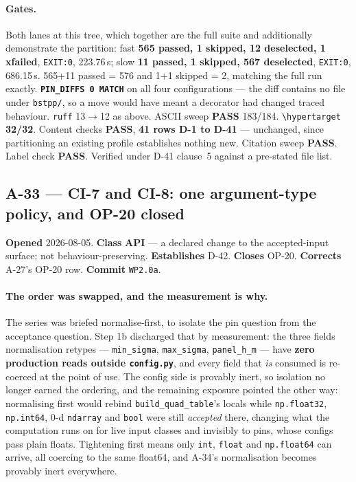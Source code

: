\documentclass[
  10pt,
]{article}
\begin{document}
\paragraph{Gates.}
Both lanes at this tree, which together are the full suite and additionally demonstrate the partition: fast \textbf{565 passed, 1 skipped, 12 deselected, 1 xfailed}, \texttt{EXIT:0}, 223.76\,s; slow \textbf{11 passed, 1 skipped, 567 deselected}, \texttt{EXIT:0}, 686.15\,s. 565+11 passed = 576 and 1+1 skipped = 2, matching the full run exactly. \textbf{\texttt{PIN\_DIFFS 0 MATCH}} on all four configurations --- the diff contains no file under \texttt{bstpp/}, so a move would have meant a decorator had changed traced behaviour. \texttt{ruff} 13$\rightarrow$12 as above. ASCII sweep \textbf{PASS} 183/184. \texttt{\textbackslash hypertarget} \textbf{32/32}. Content checks \textbf{PASS}, \textbf{41 rows D-1 to D-41} --- unchanged, since partitioning an existing profile establishes nothing new. Citation sweep \textbf{PASS}. Label check \textbf{PASS}. Verified under D-41 clause~5 against a pre-stated file list.

\hypertarget{a-33}{%
\subsection{A-33 --- CI-7 and CI-8: one argument-type policy, and OP-20 closed}\label{a-33}}

\textbf{Opened} 2026-08-05. \textbf{Class} \textbf{API} --- a declared change to the accepted-input surface; not behaviour-preserving. \textbf{Establishes} D-42. \textbf{Closes} OP-20. \textbf{Corrects} A-27's OP-20 row. \textbf{Commit} \texttt{WP2.0a}.

\paragraph{The order was swapped, and the measurement is why.}
The series was briefed normalise-first, to isolate the pin question from the acceptance question. Step 1b discharged that by measurement: the three fields normalisation retypes --- \texttt{min\_sigma}, \texttt{max\_sigma}, \texttt{panel\_h\_m} --- have \textbf{zero production reads outside \texttt{config.py}}, and every field that \emph{is} consumed is re-coerced at the point of use. The config side is provably inert, so isolation no longer earned the ordering, and the remaining exposure pointed the other way: normalising first would rebind \texttt{build\_quad\_table}'s locals while \texttt{np.float32}, \texttt{np.int64}, 0-d \texttt{ndarray} and \texttt{bool} were still \emph{accepted} there, changing what the computation runs on for live input classes and invisibly to pins, whose configs pass plain floats. Tightening first means only \texttt{int}, \texttt{float} and \texttt{np.float64} can arrive, all coercing to the same float64, and A-34's normalisation becomes provably inert everywhere.
\end{document}
